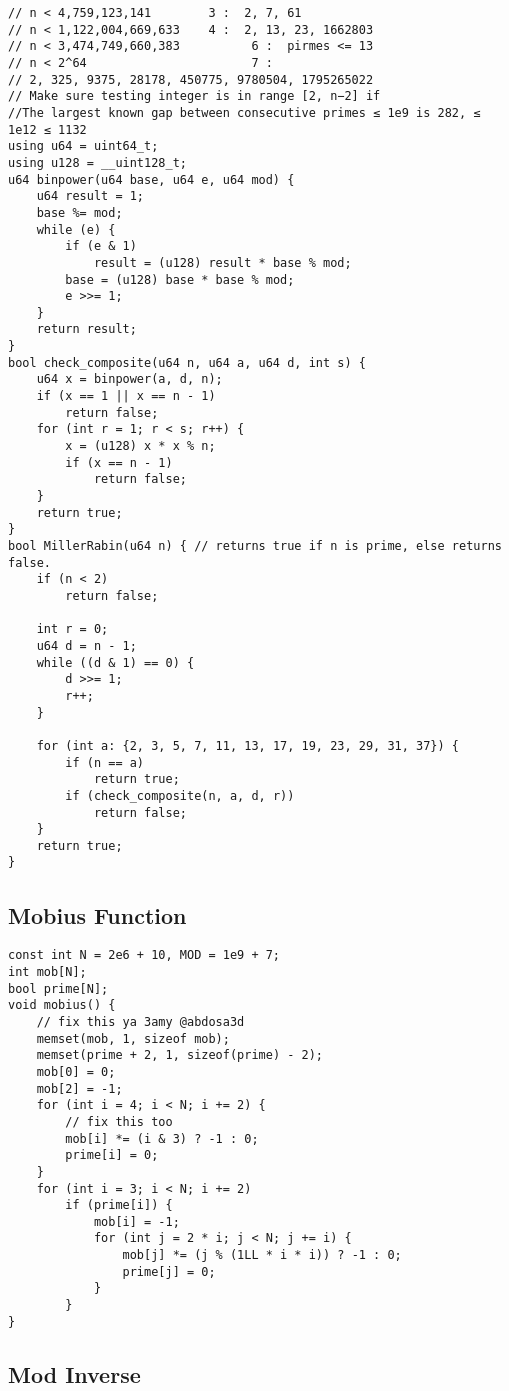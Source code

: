 \begin{lstlisting}[style=cpp]
// n < 4,759,123,141        3 :  2, 7, 61  
// n < 1,122,004,669,633    4 :  2, 13, 23, 1662803  
// n < 3,474,749,660,383          6 :  pirmes <= 13  
// n < 2^64                       7 :  
// 2, 325, 9375, 28178, 450775, 9780504, 1795265022  
// Make sure testing integer is in range [2, n−2] if
//The largest known gap between consecutive primes ≤ 1e9 is 282, ≤ 1e12 ≤ 1132
using u64 = uint64_t;
using u128 = __uint128_t;
u64 binpower(u64 base, u64 e, u64 mod) {
    u64 result = 1;
    base %= mod;
    while (e) {
        if (e & 1)
            result = (u128) result * base % mod;
        base = (u128) base * base % mod;
        e >>= 1;
    }
    return result;
}
bool check_composite(u64 n, u64 a, u64 d, int s) {
    u64 x = binpower(a, d, n);
    if (x == 1 || x == n - 1)
        return false;
    for (int r = 1; r < s; r++) {
        x = (u128) x * x % n;
        if (x == n - 1)
            return false;
    }
    return true;
}
bool MillerRabin(u64 n) { // returns true if n is prime, else returns false.
    if (n < 2)
        return false;

    int r = 0;
    u64 d = n - 1;
    while ((d & 1) == 0) {
        d >>= 1;
        r++;
    }

    for (int a: {2, 3, 5, 7, 11, 13, 17, 19, 23, 29, 31, 37}) {
        if (n == a)
            return true;
        if (check_composite(n, a, d, r))
            return false;
    }
    return true;
}
\end{lstlisting}

\subsection{Mobius Function}

\begin{lstlisting}[style=cpp]
const int N = 2e6 + 10, MOD = 1e9 + 7;
int mob[N];
bool prime[N];
void mobius() {
	// fix this ya 3amy @abdosa3d
    memset(mob, 1, sizeof mob);
    memset(prime + 2, 1, sizeof(prime) - 2);
    mob[0] = 0;
    mob[2] = -1;
    for (int i = 4; i < N; i += 2) {
	    // fix this too 
        mob[i] *= (i & 3) ? -1 : 0;
        prime[i] = 0;
    }
    for (int i = 3; i < N; i += 2)
        if (prime[i]) {
            mob[i] = -1;
            for (int j = 2 * i; j < N; j += i) {
                mob[j] *= (j % (1LL * i * i)) ? -1 : 0;
                prime[j] = 0;
            }
        }
}
\end{lstlisting}

\subsection{Mod Inverse}

